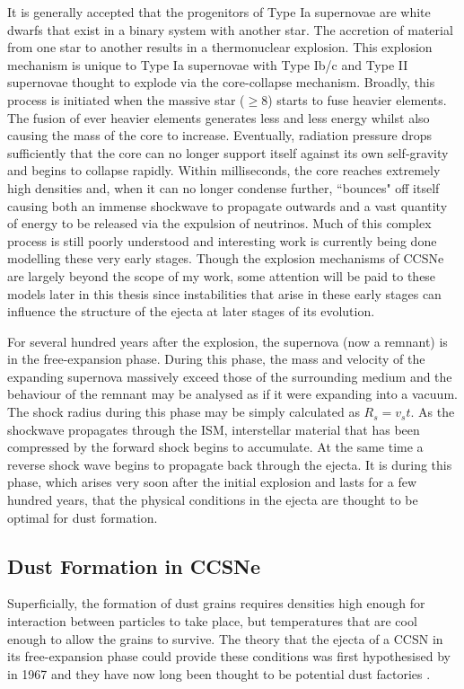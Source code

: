 It is generally accepted that the progenitors of Type Ia supernovae are white dwarfs that exist in a binary system with another star.  The accretion of material from one star to another results in a thermonuclear explosion.  This explosion mechanism is unique to Type Ia supernovae with Type Ib/c and Type II supernovae thought to explode via the core-collapse mechanism.  Broadly, this process is initiated when the massive star ($\ge 8$\msun) starts to fuse heavier elements. The fusion of ever heavier elements generates less and less energy whilst also causing the mass of the core to increase.  Eventually, radiation pressure drops sufficiently that the core can no longer support itself against its own self-gravity and begins to collapse rapidly. Within milliseconds, the core reaches extremely high densities and, when it can no longer condense further, ``bounces" off itself causing both an immense shockwave to propagate outwards and a vast quantity of energy to be released via the expulsion of neutrinos.  Much of this complex process is still poorly understood and interesting work is currently being done modelling these very early stages.  Though the explosion mechanisms of CCSNe are largely beyond the scope of my work, some attention will be paid to these models later in this thesis since instabilities that arise in these early stages can influence the structure of the ejecta at later stages of its evolution.

For several hundred years after the explosion, the supernova (now a remnant) is in the free-expansion phase. During this phase, the mass and velocity of the expanding supernova massively exceed those of the surrounding medium and the behaviour of the remnant may be analysed as if it were expanding into a vacuum.  The shock radius during this phase may be simply calculated as $R_s = v_s t$.  As the shockwave propagates through the ISM, interstellar material that has been compressed by the forward shock begins to accumulate.  At the same time a reverse shock wave begins to propagate back through the ejecta.  It is during this phase, which arises very soon after the initial explosion and lasts for a few hundred years, that the physical conditions in the ejecta are thought to be optimal for dust formation.


\subsection{Dust Formation in CCSNe}

Superficially, the formation of dust grains requires densities high enough for interaction between particles to take place, but temperatures that are cool enough to allow the grains to survive.  The theory that the ejecta of a CCSN in its free-expansion phase could provide these conditions  was first hypothesised by \citeauthor{Cernuschi1967} in 1967 and they have now long been thought to be potential dust factories \citep{Hoyle1970, Kozasa1991, Todini2001}.  

